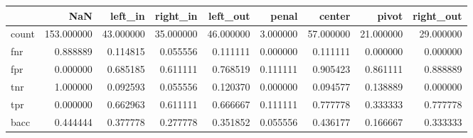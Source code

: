 \begin{tabular}{lrrrrrrrr}
\toprule
{} &         NaN &    left\_in &   right\_in &   left\_out &     penal &     center &      pivot &  right\_out \\
\midrule
count &  153.000000 &  43.000000 &  35.000000 &  46.000000 &  3.000000 &  57.000000 &  21.000000 &  29.000000 \\
fnr   &    0.888889 &   0.114815 &   0.055556 &   0.111111 &  0.000000 &   0.111111 &   0.000000 &   0.000000 \\
fpr   &    0.000000 &   0.685185 &   0.611111 &   0.768519 &  0.111111 &   0.905423 &   0.861111 &   0.888889 \\
tnr   &    1.000000 &   0.092593 &   0.055556 &   0.120370 &  0.000000 &   0.094577 &   0.138889 &   0.000000 \\
tpr   &    0.000000 &   0.662963 &   0.611111 &   0.666667 &  0.111111 &   0.777778 &   0.333333 &   0.777778 \\
bacc  &    0.444444 &   0.377778 &   0.277778 &   0.351852 &  0.055556 &   0.436177 &   0.166667 &   0.333333 \\
\bottomrule
\end{tabular}
